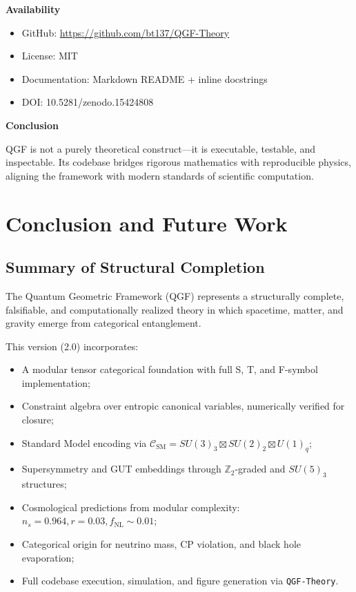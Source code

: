 \documentclass[11pt]{article}
\begin{document}
\vspace{0.5em}
\noindent\textbf{Availability}

\begin{itemize}
  \item GitHub: \url{https://github.com/bt137/QGF-Theory}
  \item License: MIT
  \item Documentation: Markdown README + inline docstrings
  \item DOI: 10.5281/zenodo.15424808
\end{itemize}

\vspace{0.5em}
\noindent\textbf{Conclusion}

QGF is not a purely theoretical construct—it is executable, testable, and inspectable. Its codebase bridges rigorous mathematics with reproducible physics, aligning the framework with modern standards of scientific computation.



\section{Conclusion and Future Work}

\subsection{Summary of Structural Completion}

The Quantum Geometric Framework (QGF) represents a structurally complete, falsifiable, and computationally realized theory in which spacetime, matter, and gravity emerge from categorical entanglement.

This version (2.0) incorporates:

\begin{itemize}
  \item A modular tensor categorical foundation with full S, T, and F-symbol implementation;
  \item Constraint algebra over entropic canonical variables, numerically verified for closure;
  \item Standard Model encoding via \( \mathcal{C}_{\text{SM}} = SU(3)_3 \boxtimes SU(2)_2 \boxtimes U(1)_q \);
  \item Supersymmetry and GUT embeddings through \( \mathbb{Z}_2 \)-graded and \( SU(5)_3 \) structures;
  \item Cosmological predictions from modular complexity: \( n_s = 0.964, r = 0.03, f_{\text{NL}} \sim 0.01 \);
  \item Categorical origin for neutrino mass, CP violation, and black hole evaporation;
  \item Full codebase execution, simulation, and figure generation via \texttt{QGF-Theory}.
\end{itemize}
\end{document}
